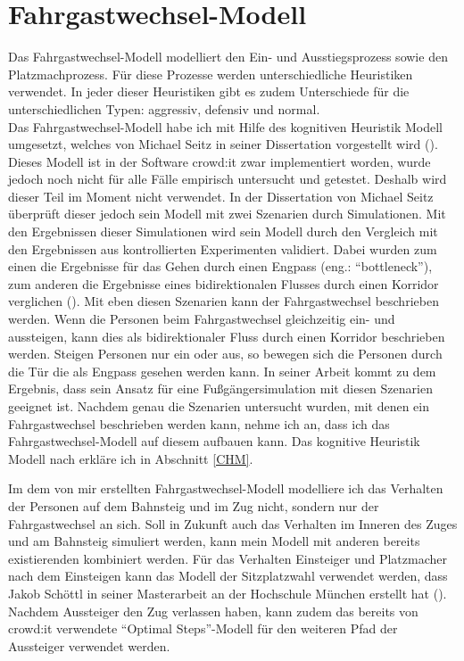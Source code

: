 \section{Fahrgastwechsel-Modell} \label{Fahrgastwechsel-Modell}
Das Fahrgastwechsel-Modell modelliert den Ein- und Ausstiegsprozess sowie den Platzmachprozess. Für diese Prozesse werden unterschiedliche Heuristiken verwendet. In jeder dieser Heuristiken gibt es zudem Unterschiede für die unterschiedlichen Typen: aggressiv, defensiv und normal. \\
Das Fahrgastwechsel-Modell habe ich mit Hilfe des kognitiven Heuristik Modell umgesetzt, welches von Michael Seitz in seiner Dissertation vorgestellt wird (\cite{Seitz.2016}). Dieses Modell ist in der Software crowd:it zwar implementiert worden, wurde jedoch noch nicht für alle Fälle empirisch untersucht und getestet. Deshalb wird dieser Teil im Moment nicht verwendet. In der Dissertation von Michael Seitz überprüft dieser jedoch sein Modell mit zwei Szenarien durch Simulationen. Mit den Ergebnissen dieser Simulationen wird sein Modell durch den Vergleich mit den Ergebnissen aus kontrollierten Experimenten validiert. Dabei wurden zum einen die Ergebnisse für das Gehen durch einen Engpass (eng.: "`bottleneck"'), zum anderen die Ergebnisse eines bidirektionalen Flusses durch einen Korridor verglichen (\cite{Seitz.2016}). Mit eben diesen Szenarien kann der Fahrgastwechsel beschrieben werden. Wenn die Personen beim Fahrgastwechsel gleichzeitig ein- und aussteigen, kann dies als bidirektionaler Fluss durch einen Korridor beschrieben werden. Steigen Personen nur ein oder aus, so bewegen sich die Personen durch die Tür die als Engpass gesehen werden kann. In seiner Arbeit kommt \cite{Seitz.2016} zu dem Ergebnis, dass sein Ansatz für eine Fußgängersimulation mit diesen Szenarien geeignet ist. Nachdem genau die Szenarien untersucht wurden, mit denen ein Fahrgastwechsel beschrieben werden kann, nehme ich an, dass ich das Fahrgastwechsel-Modell auf diesem aufbauen kann. Das kognitive Heuristik Modell nach \cite{Seitz.2016} erkläre ich in Abschnitt \ref{CHM}.

Im dem von mir erstellten Fahrgastwechsel-Modell modelliere ich das Verhalten der Personen auf dem Bahnsteig und im Zug nicht, sondern nur der Fahrgastwechsel an sich. Soll in Zukunft auch das Verhalten im Inneren des Zuges und am Bahnsteig simuliert werden, kann mein Modell mit anderen bereits existierenden kombiniert werden. Für das Verhalten Einsteiger und Platzmacher nach dem Einsteigen kann das Modell der Sitzplatzwahl verwendet werden, dass Jakob Schöttl in seiner Masterarbeit an der Hochschule München erstellt hat (\cite{Schottl.2016}). Nachdem Aussteiger den Zug verlassen haben, kann zudem das bereits von crowd:it verwendete "`Optimal Steps"'-Modell für den weiteren Pfad der Aussteiger verwendet werden.
